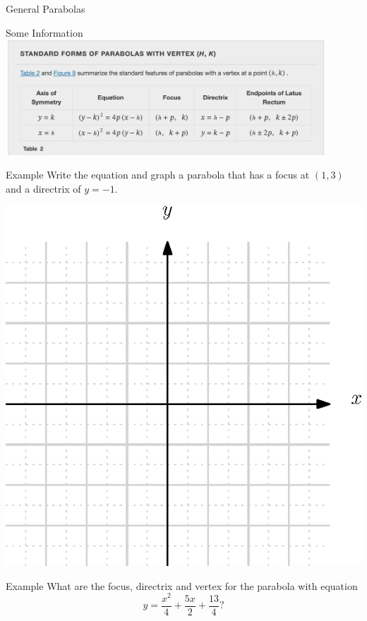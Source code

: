 \documentclass[presentation]{beamer}
\begin{document}
\begin{frame}[label={sec:org4c71854}]{General Parabolas}
\end{frame}

\begin{frame}[label={sec:org6dd9571}]{Some Information}
\includegraphics[width=0.9\textwidth]{./parabs_gen}
\end{frame}

\begin{frame}[label={sec:orgbfb227a}]{Example}
Write the equation and graph a parabola that has a focus at \(\left(
1,3 \right)\) and a directrix of \(y = -1.\)

\includegraphics[scale=0.9]{./blank_grid}
\end{frame}

\begin{frame}[label={sec:org6bae603}]{Example}
What are the focus, directrix and vertex for the parabola with equation
\[
y = \frac{x^2}{4}+\frac{5x}{2}+\frac{13}{4}?\]

\vspace{10in}
\end{frame}
\end{document}
